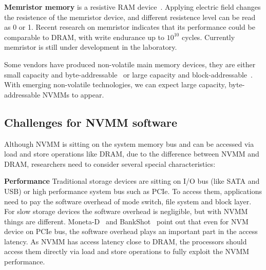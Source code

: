 \textbf{Memristor memory} is a resistive RAM device~\cite{memristor}.
Applying electric field
changes the resistence of the memristor device, and different resistence level
can be read as 0 or 1. Recent research on memristor indicates that its
performance could be comparable to DRAM, with write endurance up to $10^{10}$
cycles. Currently memristor is still under development in the laboratory.
 
Some vendors have produced non-volatile main memory devices, they are
either small capacity and byte-addressable~\cite{micron-nvdimm}
or large capacity and block-addressable~\cite{smart-system}.
With emerging non-volatile technologies, we can expect
large capacity, byte-addressable NVMMs to appear.

\begin{table}
	\vspace*{1mm}
	\caption{}
	\label{table:techtrend}
\end{table}

\subsection{Challenges for NVMM software}
\label{sec:challenge}

Although NVMM is sitting on the system memory bus and can be accessed
via load and store operations like DRAM, due to the difference between NVMM
and DRAM,
researchers need to consider several special characteristics:

\textbf{Performance} Traditional storage devices are sitting on I/O bus
(like SATA and USB) or high performance system bus such as PCIe. To access
them, applications need to pay the software overhead of mode switch, 
file system and
block layer. For slow storage devices the software overhead is negligible,
but with NVMM things are different. Moneta-D~\cite{monetad} and
BankShot~\cite{BankShot} point out that even for NVM device on PCIe bus,
the software overhead plays an important part in the access latency.
As NVMM has access latency close to
DRAM, the processors should access them directly via load and store
operations to fully exploit the NVMM performance.

